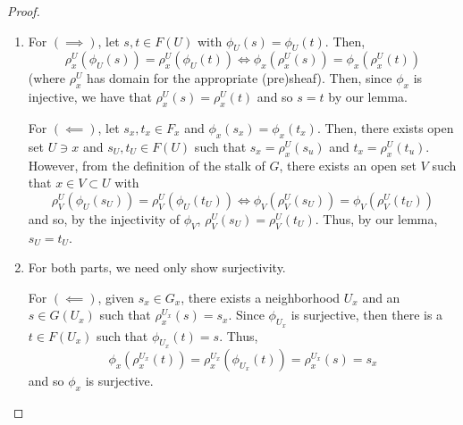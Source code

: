 \documentclass[11pt,leqno,oneside]{amsbook}
\renewcommand{\F}{F} %
\newcommand{\G}{G}
\numberwithin{thm}{section}
\begin{document}
\begin{proof}
  \begin{enumerate}
  \item For \((\implies)\), let \(s,t \in \F(U)\) with \(\phi_U(s) =
    \phi_U(t)\). Then, \[
      \rho^U_x(\phi_U(s)) = \rho^U_x(\phi_U(t)) \iff
      \phi_x(\rho^U_x(s)) = \phi_x(\rho^U_x(t))
    \]
    (where \(\rho^U_x\) has domain for the appropriate
    (pre)sheaf). Then, since \(\phi_x\) is injective, we have that
    \(\rho^U_x(s) = \rho^U_x(t)\) and so \(s=t\) by our lemma.

    For \((\impliedby)\), let \(s_x,t_x \in F_x\) and \(\phi_x(s_x) =
    \phi_x(t_x)\). Then, there exists open set \(U \ni x\) and
    \(s_U,t_U \in F(U)\) such that \(s_x = \rho^U_x(s_u)\) and \(t_x =
    \rho^U_x(t_u)\). However, from the definition of the stalk of
    \(G\), there 
    exists an open set \(V\) such that \(x \in V \subset U\) with \[
      \rho^U_V(\phi_U(s_U)) = \rho^U_V(\phi_U(t_U)) \iff
      \phi_V(\rho^U_V(s_U)) = \phi_V(\rho^U_V(t_U))
    \]
    and so, by the injectivity of \(\phi_V\), \(\rho^U_V(s_U) =
    \rho^U_V(t_U)\). Thus, by our lemma, \(s_U = t_U\).
  \item For both parts, we need only show surjectivity. 

    For \((\impliedby)\), given \(s_x \in \G_x\), there exists a
    neighborhood \(U_x\) and an
    \(s \in \G(U_x)\) such that \(\rho^{U_x}_x(s) = s_x\). Since
    \(\phi_{U_x}\) is surjective, then there is a \(t \in \F(U_x)\)
    such that \(\phi_{U_x}(t) = s\). Thus, \[
      \phi_x(\rho^{U_x}_x(t)) = \rho^{U_x}_x(\phi_{U_x}(t)) =
      \rho^{U_x}_x(s) = s_x
    \]
    and so \(\phi_x\) is surjective. 


\end{enumerate}
\end{proof}
\end{document}
